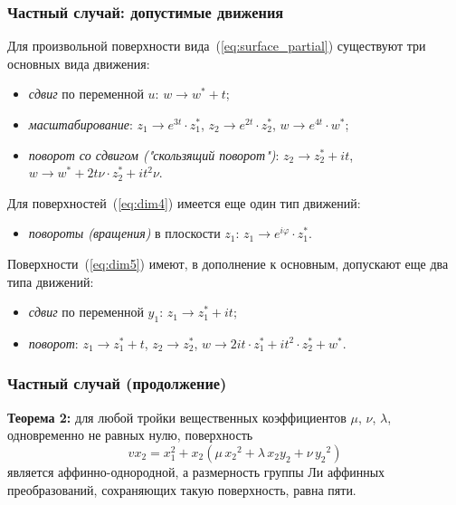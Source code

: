 \documentclass[russian,hyperref={unicode}]{beamer}
\begin{document}
{
	\frametitle{Частный случай: допустимые движения}
	Для произвольной поверхности вида~(\ref{eq:surface_partial}) существуют три основных вида движения:
	\begin{itemize}
		\item \emph{сдвиг} по переменной $u$: $w \to w^{\ast} + t$;
		\item \emph{масштабирование}: $z_1 \to e^{3t} \cdot z_1^{\ast}$, $z_2 \to e^{2t} \cdot z_2^{\ast}$, $w \to e^{4t} \cdot w^{\ast}$;
		\item \emph{поворот со сдвигом ("скользящий поворот")}: $z_2 \to z_2^{\ast} + i t$, $w \to w^{\ast} + 2 t \nu \cdot z_2^{\ast} + i t^2 \nu$.
	\end{itemize}

	Для поверхностей~(\ref{eq:dim4}) имеется еще один тип движений:
	\begin{itemize}
		\item \emph{повороты (вращения)} в плоскости $z_1$: $z_1 \to e^{i \varphi}  \cdot z_1^{\ast}$.
	\end{itemize}

	Поверхности~(\ref{eq:dim5}) имеют, в дополнение к основным, допускают еще два типа движений:
	\begin{itemize}
		\item \emph{сдвиг} по переменной $y_1$: $z_1 \to z_1^{\ast} + i t$;
		\item \emph{поворот}: $z_1 \to z_1^{\ast} + t$, $z_2 \to z_2^{\ast}$, $w \to 2 i t \cdot z_1^{\ast} +  i t^2 \cdot z_2^{\ast} + w^{\ast}$.
	\end{itemize}
}
\frame
{
	\frametitle{Частный случай (продолжение)}
	\textbf{Теорема 2:}
	для любой тройки вещественных коэффициентов $\mu$, $\nu$, $\lambda$,
	одновременно не равных нулю, поверхность
	\begin{equation*}
		v x_2 = x_1^2 + x_2 (\mu\,{x_2}^2 + \lambda\,x_2 y_2 + \nu\,{y_2}^2)
	\end{equation*}
	является аффинно-однородной, а размерность группы Ли аффинных преобразований,
    сохраняющих такую поверхность, равна пяти.
}
\end{document}
